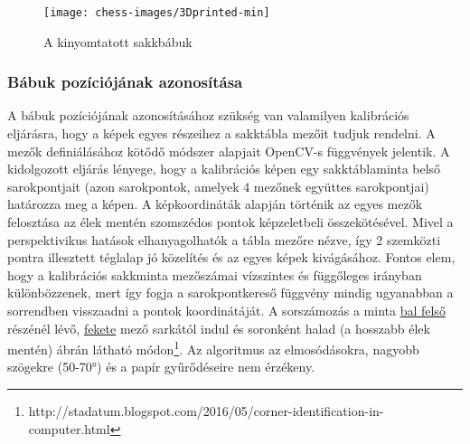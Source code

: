 \documentclass[../documentation.tex]{subfiles}
\begin{document}
\begin{figure}
\centering
\texttt{[image: chess-images/3Dprinted-min]}
\caption{A kinyomtatott sakkbábuk}
\label{fig:3dprinted}
\end{figure}

\subsubsection{Bábuk pozíciójának azonosítása}
A bábuk pozíciójának azonosításához szükség van valamilyen kalibrációs eljárásra, hogy a képek egyes részeihez a sakktábla mezőit tudjuk rendelni. A mezők definiálásához kötődő módszer alapjait OpenCV-s függvények jelentik. A kidolgozott eljárás lényege, hogy a kalibrációs képen egy sakktáblaminta belső sarokpontjait (azon sarokpontok, amelyek 4 mezőnek együttes sarokpontjai) határozza meg a képen. A képkoordináták alapján történik az egyes mezők felosztása az élek mentén szomszédos pontok képzeletbeli összekötésével. Mivel a perspektivikus hatások elhanyagolhatók a tábla mezőre nézve, így 2 szemközti pontra illesztett téglalap jó közelítés és az egyes képek kivágásához. Fontos elem, hogy a kalibrációs sakkminta mezőszámai vízszintes és függőleges irányban különbözzenek, mert így fogja a sarokpontkereső függvény mindig ugyanabban a sorrendben visszaadni a pontok koordinátáját. A sorszámozás a minta \underline{bal felső} részénél lévő, \underline{fekete} mező sarkától indul és soronként halad (a hosszabb élek mentén)  ábrán látható módon\footnote{http://stadatum.blogspot.com/2016/05/corner-identification-in-computer.html}. Az algoritmus az elmosódásokra, nagyobb szögekre (50-70°) és a papír gyűrődéseire nem érzékeny.
\end{document}
